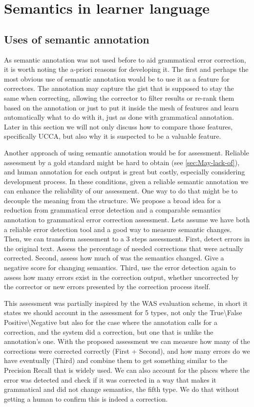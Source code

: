 \documentclass[english]{article}
\begin{document}
\section{Semantics in learner language}

\subsection{Uses of semantic annotation}

As semantic annotation was not used before to aid grammatical error
correction, it is worth noting the a-priori reasons for developing
it. The first and perhaps the most obvious use of semantic annotation
would be to use it as a feature for correctors. The annotation may
capture the gist that is supposed to stay the same when correcting,
allowing the corrector to filter results or re-rank them based on
the annotation or just to put it inside the mesh of features and learn
automatically what to do with it, just as done with grammatical annotation.
Later in this section we will not only discuss how to compare those
features, specifically UCCA, but also why it is suspected to be a
valuable feature.

Another approach of using semantic annotation would be for assessment.
Reliable assessment by a gold standard might be hard to obtain (see
\ref{sec:May-lack-of}), and human annotation for each output is great\cite{madnani2011they}
but costly, especially considering development process. In these conditions,
given a reliable semantic annotation we can enhance the reliability
of our assessment. One way to do that might be to decouple the meaning
from the structure. We propose a broad idea for a reduction from grammatical
error detection and a comparable semantics annotation to grammatical
error correction assessment. Lets assume we have both a reliable error
detection tool and a good way to measure semantic changes. Then, we
can transform assessment to a 3 steps assessment. First, detect errors
in the original text. Assess the percentage of needed corrections
that were actually corrected. Second, assess how much of was the semantics
changed. Give a negative score for changing semantics. Third, use
the error detection again to assess how many errors exist in the correction
output, whether uncorrected by the corrector or new errors presented
by the correction process itself. 

This assessment was partially inspired by the WAS evaluation scheme\cite{chodorow2012problems},
in short it states we should account in the assessment for 5 types,
not only the True\textbackslash{}False Positive\textbackslash{}Negative
but also for the case where the annotation calls for a correction,
and the system did a correction, but one that is unlike the annotation's
one. With the proposed assessment we can measure how many of the corrections
were corrected correctly (First + Second), and how many errors do
we have eventually (Third) and combine them to get something similar
to the Precision Recall that is widely used. We can also account for
the places where the error was detected and check if it was corrected
in a way that makes it grammatical and did not change semantics, the
fifth type. We do that without getting a human to confirm this is
indeed a correction.
\end{document}
